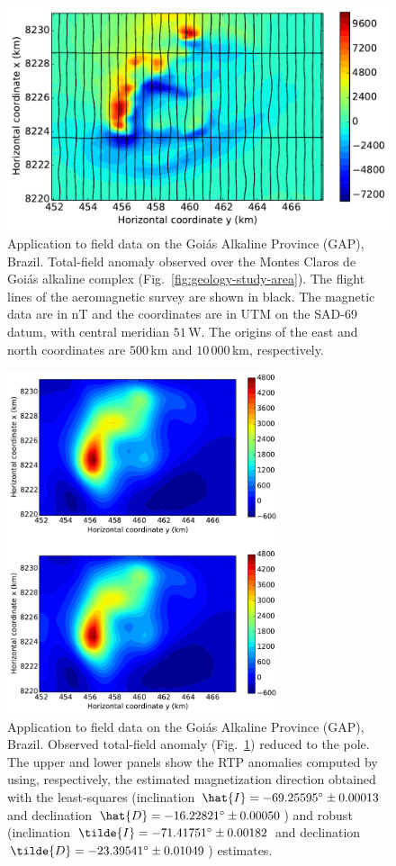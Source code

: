 \documentclass[journal abbreviation, npg]{copernicus}
\begin{document}
\begin{figure}[t]
\includegraphics[width=120mm]{Figures/npgd-2014-0069-f16}
\caption{Application to field data on the Goi\'{a}s Alkaline Province
  (GAP), Brazil. Total-field anomaly observed over the Montes Claros
  de Goi\'{a}s alkaline complex
  (Fig.~\ref{fig:geology-study-area}). The flight lines of the
  aeromagnetic survey are shown in black. The magnetic data are in nT
  and the coordinates are in UTM on the SAD-69 datum, with central
  meridian $51${\degree}\,W. The origins of the east and north
  coordinates are $500$\,\unit{km} and $10\,000$\,\unit{km},
  respectively. }
\label{fig:TFA-MCG}
\end{figure}

\begin{figure}[t]
\includegraphics[width=80mm]{Figures/npgd-2014-0069-f17}
\caption{Application to field data on the Goi\'{a}s Alkaline Province
  (GAP), Brazil. Observed total-field anomaly (Fig.~\ref{fig:TFA-MCG})
  reduced to the pole. The upper and lower panels show the RTP
  anomalies computed by using, respectively, the estimated
  magnetization direction obtained with the least-squares (inclination
  $\hat{I} = -69.25595{\degree} \pm 0.00013${\degree} and declination
  $\hat{D} = -16.22821{\degree} \pm 0.00050${\degree}) and robust
  (inclination $\tilde{I} = -71.41751{\degree} \pm 0.00182${\degree}
  and declination $\tilde{D} = -23.39541{\degree} \pm
  0.01049${\degree}) estimates. }
\label{fig:TFA-MCG-RTP}
\end{figure}
\end{document}
